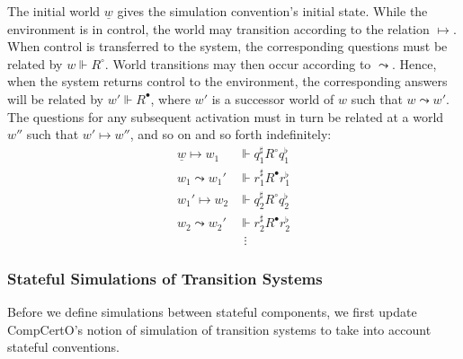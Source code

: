 \documentclass[acmsmall,screen,review,anonymous]{acmart}
\newcommand{\que}{\circ}
\newcommand{\ans}{\bullet}
\newcommand{\intl}[1]{\underline{#1}}
\begin{document}
The initial world $\intl{w}$ gives the simulation convention's initial state.
While the environment is in control,
the world may transition according to the relation $\mapsto$.
When control is transferred to the system,
the corresponding questions must be related by $w \Vdash R^\que$.
World transitions may then occur according to $\leadsto$.
Hence, when the system returns control to the environment,
the corresponding answers
will be related by $w' \Vdash R^\ans$,
where $w'$ is a successor world of $w$ such that $w \leadsto w'$.
The questions for any subsequent activation
must in turn be related at a world $w''$ such that $w' \mapsto w''$,
and so on and so forth indefinitely:
\begin{align*}
  \intl{w} \mapsto w_1 &\Vdash q^\sharp_1 \mathrel{R^\que} q^\flat_1 \\
  w_1 \leadsto w_1' &\Vdash r^\sharp_1 \mathrel{R^\ans} r^\flat_1 \\
  w_1' \mapsto w_2 &\Vdash q^\sharp_2 \mathrel{R^\que} q^\flat_2 \\
  w_2 \leadsto w_2' &\Vdash r^\sharp_2 \mathrel{R^\ans} r^\flat_2 \\[-1ex]
  &\:\:\vdots
\end{align*}


\subsubsection{Stateful Simulations of Transition Systems} %

Before we define simulations between stateful components,
we first update CompCertO's notion of simulation of transition systems
to take into account stateful conventions.
\end{document}
